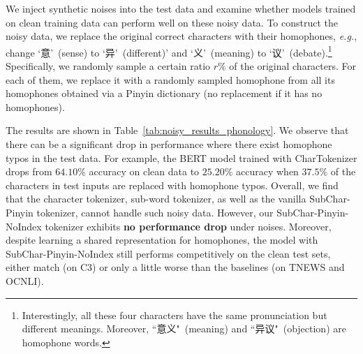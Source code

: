  We inject synthetic noises into the test data and examine whether models trained on clean training data can perform well on these noisy data.
%
To construct the noisy data, we replace the original correct characters with their homophones, \textit{e.g.}, change `意'\ (sense) to `异'\ (different)' and `义'\ (meaning) to `议'\ (debate).\footnote{Interestingly, all these four characters have the same pronunciation but different meanings. Moreover, ``意义"\ (meaning) and ``异议"\ (objection) are homophone words.}
Specifically, we randomly sample a certain ratio $r\%$ of the original characters. For each of them, we replace it with a randomly sampled homophone from all its homophones obtained via a Pinyin dictionary (no replacement if it has no homophones).





The results are shown in Table~\ref{tab:noisy_results_phonology}. 
We observe that there can be a significant drop in performance where there exist homophone typos in the test data. For example, the BERT model trained with CharTokenizer drops from $64.10\%$ accuracy on clean data to $25.20\%$ accuracy when $37.5\%$ of the characters in test inputs are replaced with homophone typos.
Overall, we find that the character tokenizer, sub-word tokenizer, as well as the vanilla SubChar-Pinyin tokenizer, cannot handle such noisy data. However, our SubChar-Pinyin-NoIndex tokenizer exhibits \textbf{no performance drop} under noises.
Moreover, despite learning a shared representation for homophones, the model with SubChar-Pinyin-NoIndex still performs competitively on the clean test sets, either match (on C3) or only a little worse than the baselines (on TNEWS and OCNLI).

